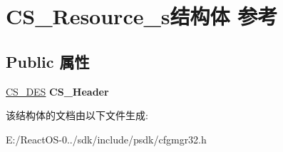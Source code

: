 \hypertarget{struct_c_s___resource__s}{}\section{C\+S\+\_\+\+Resource\+\_\+s结构体 参考}
\label{struct_c_s___resource__s}
\subsection*{Public 属性}
\begin{DoxyCompactItemize}
\item 
\mbox{\label{struct_c_s___resource__s_a2e971c7feccc964807c2cbbdcb18dae1}} 
\hyperlink{struct_c_s___des__s}{C\+S\+\_\+\+D\+ES} {\bfseries C\+S\+\_\+\+Header}
\end{DoxyCompactItemize}


该结构体的文档由以下文件生成\+:\begin{DoxyCompactItemize}
\item 
E\+:/\+React\+O\+S-\/0../sdk/include/psdk/cfgmgr32.\+h\end{DoxyCompactItemize}
